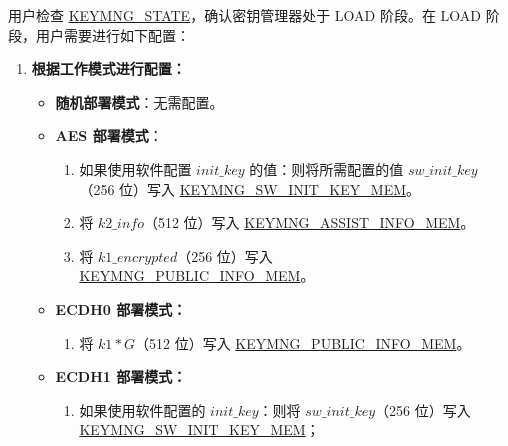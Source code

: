 \documentclass[main\_\_CN.tex]{subfiles}
\begin{document}
用户检查 \hyperref[fielddesc:KEYMNGSTATE]{KEYMNG\_STATE}，确认密钥管理器处于 LOAD 阶段。在 LOAD 阶段，用户需要进行如下配置：
\begin{enumerate}
    \item \textbf{根据工作模式进行配置：}
    \begin{itemize}
        \item \textbf{随机部署模式}：无需配置。
        \item \textbf{AES 部署模式}：
        \begin{enumerate}
            \item 如果使用软件配置 \hyperref[para:initkey]{\begin{math}init\_key\end{math}} 的值：则将所需配置的值 \begin{math}sw\_init\_key\end{math}（256 位）写入 \hyperref[mem:keymng-sw-init-key]{KEYMNG\_SW\_INIT\_KEY\_MEM}。
            \item 将 \hyperref[para:k2info]{\begin{math}k2\_info\end{math}}（512 位）写入 \hyperref[mem:keymng-assist-info]{KEYMNG\_ASSIST\_INFO\_MEM}。
            \item 将 \hyperref[para:k1enc]{\begin{math}k1\_encrypted\end{math}}（256 位）写入 \hyperref[mem:keymng-public-info]{KEYMNG\_PUBLIC\_INFO\_MEM}。
        \end{enumerate}
        \item \textbf{ECDH0 部署模式：}
        \begin{enumerate}
            \item 将 \hyperref[para:k1G]{\begin{math}k1*G\end{math}}（512 位）写入 \hyperref[mem:keymng-public-info]{KEYMNG\_PUBLIC\_INFO\_MEM}。
        \end{enumerate}
        \item \textbf{ECDH1 部署模式：}
        \begin{enumerate}
            \item 如果使用软件配置的 \hyperref[para:initkey]{\begin{math}init\_key\end{math}}：则将 \begin{math}sw\_init\_key\end{math}（256 位）写入 \hyperref[mem:keymng-sw-init-key]{KEYMNG\_SW\_INIT\_KEY\_MEM}；

\end{enumerate}
\end{itemize}
\end{enumerate}
\end{document}
